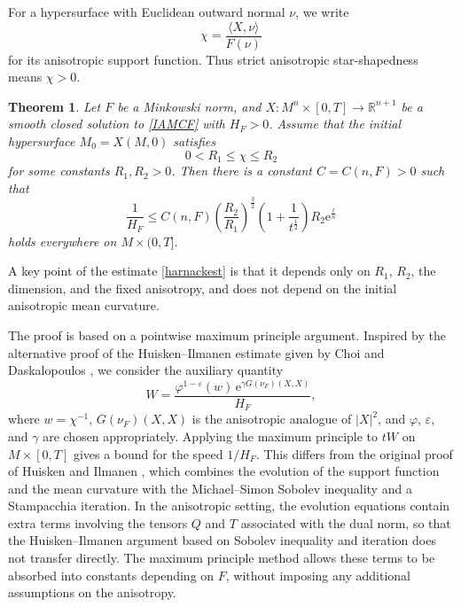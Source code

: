 \documentclass[10pt,a4paper]{amsart}
\newtheorem{theorem}[proposition]{Theorem}
\numberwithin{equation}{section}
\begin{document}
	For a hypersurface with Euclidean outward normal $\nu$, we write
	\begin{equation*}
		\chi=\frac{\langle X,\nu\rangle}{F(\nu)}
	\end{equation*}
	for its anisotropic support function. Thus strict anisotropic star-shapedness means $\chi>0$.
	
	\begin{theorem}
		\label{prop-harnack}
		Let $F$ be a Minkowski norm, and $X:M^n\times[0,T]\to\mathbb{R}^{n+1}$ be a smooth closed solution to \eqref{IAMCF} with $H_F>0$. Assume that the initial hypersurface $M_0=X(M,0)$ satisfies
		\begin{equation*}
			0< R_1 \leq \chi \leq R_2
		\end{equation*}
		for some constants $R_1,R_2>0$. Then there is a constant $C=C(n,F)>0$ such that
		\begin{equation}
			\label{harnackest}
			\dfrac{1}{H_F} \leq C(n,F)\left( \dfrac{R_2}{R_1} \right)^{\frac{3}{2}}\left( 1 + \dfrac{1}{t^{\frac{1}{2}}} \right)R_2\mathrm{e}^{\frac{t}{n}}
		\end{equation}
		holds everywhere on $M\times(0,T]$.
	\end{theorem}

	A key point of the estimate \eqref{harnackest} is that it  depends only on $R_1$, $R_2$, the dimension, and the fixed anisotropy, and does not depend on the initial anisotropic mean curvature. 
 
	The proof is based on a pointwise maximum principle argument. Inspired by the alternative proof of the Huisken--Ilmanen estimate given by Choi and Daskalopoulos \cite[Theorem A.5]{CD21}, we consider the auxiliary quantity
	\begin{equation*}
		W = \frac{\varphi^{1-\varepsilon}(w)\,\mathrm{e}^{\gamma G(\nu_F)(X,X)}}{H_F},
	\end{equation*}
	where $w=\chi^{-1}$, $G(\nu_F)(X,X)$ is the anisotropic analogue of $|X|^2$, and $\varphi$, $\varepsilon$, and $\gamma$ are chosen appropriately. Applying the maximum principle to $tW$ on $M\times[0,T]$ gives a bound for the speed $1/H_F$. This differs from the original proof of Huisken and Ilmanen \cite{HI08}, which combines the evolution of the support function and the mean curvature with the Michael--Simon Sobolev inequality and a Stampacchia iteration. In the anisotropic setting, the evolution equations contain extra terms involving the tensors $Q$ and $T$ associated with the dual norm, so that the Huisken--Ilmanen argument based on Sobolev inequality and iteration does not transfer directly. The maximum principle method allows these terms to be absorbed into constants depending on $F$, without imposing any additional assumptions on the anisotropy.
\end{document}
